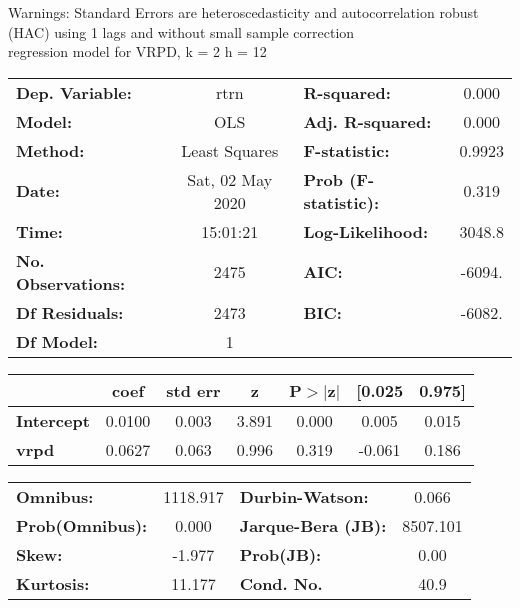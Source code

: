 Warnings: \newline
 [1] Standard Errors are heteroscedasticity and autocorrelation robust (HAC) using 1 lags and without small sample correction\\ 

regression model for VRPD, k = 2 h = 12\begin{center}
\begin{tabular}{lclc}
\toprule
\textbf{Dep. Variable:}    &       rtrn       & \textbf{  R-squared:         } &     0.000   \\
\textbf{Model:}            &       OLS        & \textbf{  Adj. R-squared:    } &     0.000   \\
\textbf{Method:}           &  Least Squares   & \textbf{  F-statistic:       } &    0.9923   \\
\textbf{Date:}             & Sat, 02 May 2020 & \textbf{  Prob (F-statistic):} &    0.319    \\
\textbf{Time:}             &     15:01:21     & \textbf{  Log-Likelihood:    } &    3048.8   \\
\textbf{No. Observations:} &        2475      & \textbf{  AIC:               } &    -6094.   \\
\textbf{Df Residuals:}     &        2473      & \textbf{  BIC:               } &    -6082.   \\
\textbf{Df Model:}         &           1      & \textbf{                     } &             \\
\bottomrule
\end{tabular}
\begin{tabular}{lcccccc}
                   & \textbf{coef} & \textbf{std err} & \textbf{z} & \textbf{P$> |$z$|$} & \textbf{[0.025} & \textbf{0.975]}  \\
\midrule
\textbf{Intercept} &       0.0100  &        0.003     &     3.891  &         0.000        &        0.005    &        0.015     \\
\textbf{vrpd}      &       0.0627  &        0.063     &     0.996  &         0.319        &       -0.061    &        0.186     \\
\bottomrule
\end{tabular}
\begin{tabular}{lclc}
\textbf{Omnibus:}       & 1118.917 & \textbf{  Durbin-Watson:     } &    0.066  \\
\textbf{Prob(Omnibus):} &   0.000  & \textbf{  Jarque-Bera (JB):  } & 8507.101  \\
\textbf{Skew:}          &  -1.977  & \textbf{  Prob(JB):          } &     0.00  \\
\textbf{Kurtosis:}      &  11.177  & \textbf{  Cond. No.          } &     40.9  \\
\bottomrule
\end{tabular}
\end{center}

